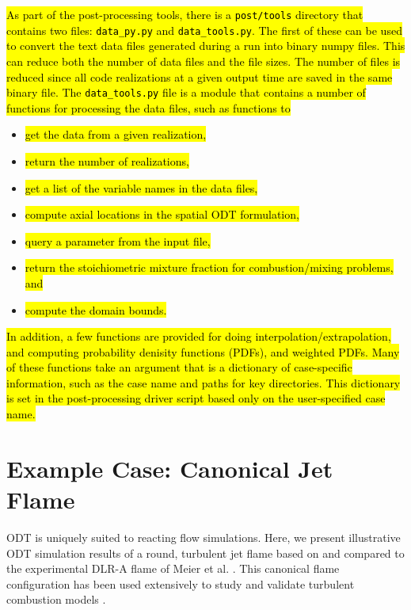 \documentclass[preprint,12pt, a4paper]{elsarticle}
\begin{document}
\hl{As part of the post-processing tools, there is a \texttt{post/tools} directory that contains two files: \texttt{data\_py.py} and \texttt{data\_tools.py}. The first of these can be used to convert the text data files generated during a run into binary numpy files. This can reduce both the number of data files and the file sizes. The number of files is reduced since all code realizations at a given output time are saved in the same binary file. The \texttt{data\_tools.py} file is a module that contains a number of functions for processing the data files, such as functions to}
%
\begin{itemize}
    \item \hl{get the data from a given realization,}
    \item \hl{return the number of realizations,}
    \item \hl{get a list of the variable names in the data files,}
    \item \hl{compute axial locations in the spatial ODT formulation,}
    \item \hl{query a parameter from the input file,}
    \item \hl{return the stoichiometric mixture fraction for combustion/mixing problems, and}
    \item \hl{compute the domain bounds.}
\end{itemize}
%
\hl{In addition, a few functions are provided for doing interpolation/extrapolation, and computing probability denisity functions (PDFs), and weighted PDFs.
Many of these functions take an argument that is a dictionary of case-specific information, such as the case name and paths for key directories. This dictionary is set in the post-processing driver script based only on the user-specified case name.
}


\section{Example Case: Canonical Jet Flame}
\label{sec:examples}

ODT is uniquely suited to reacting flow simulations. Here, we present illustrative ODT simulation results of a round, turbulent jet flame based on and compared to the experimental DLR-A flame of Meier et al. \cite{Meier_2000}. This canonical flame configuration has been used extensively to study and validate turbulent combustion models \cite{Pitsch_2000,Lindstedt_2005,Wang_2011,Fairweather_2004,Lee_2008,Lee_2009}. 
\end{document}
